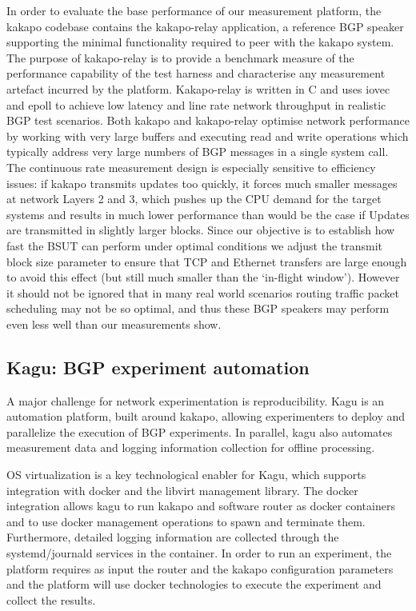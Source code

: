 In order to evaluate the base performance of our measurement platform, the
kakapo codebase contains the kakapo-relay application, a reference BGP speaker
supporting the minimal functionality required to peer with the kakapo system.
The purpose of kakapo-relay is to provide a benchmark measure of the
performance capability of the test harness and characterise any measurement
artefact incurred by the platform. Kakapo-relay is written in C and uses iovec
and epoll to achieve low latency and line rate network throughput in realistic
BGP test scenarios.  Both kakapo and kakapo-relay optimise network performance
by working with very large buffers and executing read and write operations
which typically address very large numbers of BGP messages in a single system
call.  The continuous rate measurement design is especially sensitive to
efficiency issues: if kakapo transmits updates too quickly, it forces much
smaller messages at network Layers 2 and 3, which pushes up the CPU demand for
the target systems and results in much lower performance than would be the case
if Updates are transmitted in slightly larger blocks.  Since our objective is
to establish how fast the BSUT can perform under optimal conditions we adjust
the transmit block size parameter to ensure that TCP and Ethernet transfers are
large enough to avoid this effect (but still much smaller than the `in-flight
window').  However it should not be ignored that in many real world scenarios
routing traffic packet scheduling may not be so optimal, and thus these BGP
speakers may perform even less well than our measurements show.

\subsection{Kagu: BGP experiment automation}

A major challenge for network experimentation is reproducibility. Kagu is an
automation platform, built around kakapo, allowing experimenters to deploy and
parallelize the execution of BGP experiments. In parallel, kagu also automates
measurement data and logging information collection for offline processing.

OS virtualization is a key technological enabler for Kagu, which supports
integration with docker and the libvirt management library.  The docker
integration allows kagu to run kakapo and software router as docker containers
and to use docker management operations to spawn and terminate them.
Furthermore, detailed logging information are collected through the
systemd/journald services in the container. In order to run an experiment, the
platform requires as input the router and the kakapo configuration parameters
and the platform will use docker technologies to execute the experiment and
collect the results.

